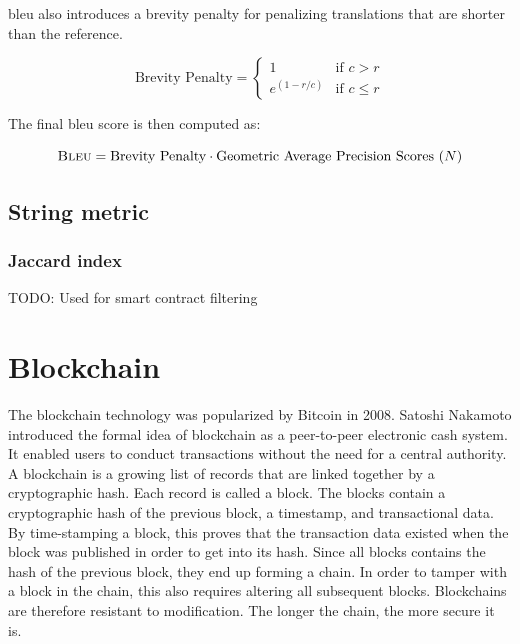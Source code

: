 \noindent \acrshort{bleu} also introduces a brevity penalty for penalizing translations that are shorter than the reference.

\begin{equation}
    \label{eqn:brevity-penalty}
    \text{Brevity Penalty} = 
    \begin{cases}
        1 & \text{if } c > r\\
        e^{\left(1-r/c \right)} & \text{if } c \le r
    \end{cases}
\end{equation}

\noindent The final \acrshort{bleu} score is then computed as:

\begin{equation}
    \label{eqn:bleu}
    \textsc{Bleu} = \text{Brevity Penalty} \cdot \text{Geometric Average Precision Scores $\left(N\right)$}
\end{equation}

\subsection{String metric}
\label{sec:string-metric}

\subsubsection{Jaccard index}
\label{sec:jaccard-index}
TODO: Used for smart contract filtering

\section{Blockchain}
\label{sec:blockchain}
The blockchain technology was popularized by Bitcoin in 2008. Satoshi Nakamoto introduced the formal idea of blockchain as a peer-to-peer electronic cash system. It enabled users to conduct transactions without the need for a central authority. A blockchain is a growing list of records that are linked together by a cryptographic hash. Each record is called a block. The blocks contain a cryptographic hash of the previous block, a timestamp, and transactional data. By time-stamping a block, this proves that the transaction data existed when the block was published in order to get into its hash. Since all blocks contains the hash of the previous block, they end up forming a chain. In order to tamper with a block in the chain, this also requires altering all subsequent blocks. Blockchains are therefore resistant to modification. The longer the chain, the more secure it is.

